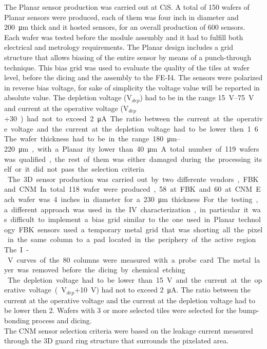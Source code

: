The Planar sensor production was carried out at CiS. A total of 150 wafers of Planar sensors were produced, each of them was four inch in diameter and \SI{200}{\micro\meter} thick and it hosted sensors, for an overall production of 600 sensors.
Each wafer was tested before the module assembly and it had to fulfill both electrical and metrology requirements.
The Planar  design includes a grid structure that allows biasing of the entire sensor by means of a punch-through technique.  This bias grid was used to evaluate the quality of the tiles at wafer level, before the dicing and the assembly to the FE-I4.
The sensors were polarized in reverse bias voltage, for sake of simplicity the voltage value will be reported in absolute value. The depletion voltage (V$_{dep}$) had to be in the range \SIrange{15}{75}{\volt} and current at the operative voltage (V$_{dep}$+\SI{30}) had not to exceed \SI{2}{\micro\ampere}. The ratio between the current at the operative voltage  and the current at the depletion voltage had to be lower then 1.6. The wafer thickness had to be in the range \SIrange{180}{220}{\micro \meter}, with a Planar ity lower than \SI{40}{\micro\meter}. A total number of 119 wafers was qualified, the rest of them was either damaged during the processing itself or it did not pass the selection criteria.\cite{Witting_thesis}\\
The 3D sensor production was carried out by two differente vendors, FBK and CNM. In total 118 wafer were produced, 58 at FBK and 60 at CNM. Each  wafer was 4 inches in diameter for a \SI{230}{\micro\meter} thickness.
For the testing, a different approach was used in the IV characterization, in particular it was difficult to implement a bias grid similar to the one used in Planar technology. FBK sensors used a temporary metal grid that was shorting all the pixel in the same column to a pad located in the periphery of the active region. The I-V curves of the 80 columns were measured with a probe card. The metal layer was removed before the dicing by chemical etching.\\
The depletion voltage had to be lower than \SI{15}{\volt} and the current at the operative voltage (V$_{dep}$+\SI{10}{\volt}) had not to exceed \SI{2}{\micro\ampere}. The ratio between the current at the operative voltage and the current at the depletion voltage had to be lower then 2. Wafers with 3 or more selected tiles were selected for the bump-bonding process and dicing.\cite{Nanni_3D}\\
The CNM sensor selection criteria were based on the leakage current measured through the 3D guard ring structure that surrounds the pixelated area. %
